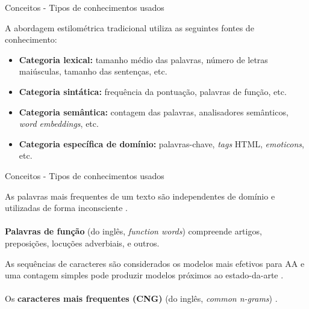 \begin{frame}{Conceitos - Tipos de conhecimentos usados}

A abordagem estilométrica tradicional utiliza as seguintes fontes de conhecimento:

\begin{itemize}
	\item {\bf Categoria lexical:} tamanho médio das palavras, número de letras maiúsculas, tamanho das sentenças, etc.
	
	\item {\bf Categoria sintática:} frequência da pontuação, palavras de função, etc.
	
	\item {\bf Categoria semântica:} contagem das palavras, analisadores semânticos, {\it word embeddings}, etc. 
	
	\item {\bf Categoria específica de domínio:} palavras-chave, {\it tags} HTML, {\it emoticons}, etc.
\end{itemize}
\end{frame}

\begin{frame}{Conceitos - Tipos de conhecimentos usados}
	\begin{tcolorbox}[colback=blue!1!white,colframe=blue!35!black,title=Palavras,height=3cm,valign=center]
		As palavras mais frequentes de um texto são independentes de domínio e utilizadas de forma inconsciente \cite{Kestemont2014}.\\ \\
		{\bf Palavras de função} (do inglês, {\it function words}) compreende artigos, preposições, locuções adverbiais, e outros.	
	\end{tcolorbox}

	\begin{tcolorbox}[colback=green!1!white,colframe=green!35!black,title=Caracteres,height=4cm,valign=center]
		As sequências de caracteres são considerados os modelos mais efetivos para AA \cite{KjellWF94,Neal2017} e uma contagem simples pode produzir modelos próximos ao estado-da-arte \cite{Neal2017}.\\ \\
		Os {\bf caracteres mais frequentes (CNG)} (do inglês, {\it common n-grams}) \cite{Keselj2003,Sapkota2014}.
	\end{tcolorbox}
\end{frame}

